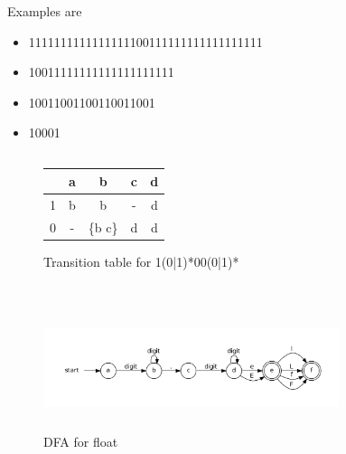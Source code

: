 \documentclass{article}
\begin{document}
Examples are 
\begin{itemize}
  \item 1111111111111111100111111111111111111
  \item 10011111111111111111111
  \item 10011001100110011001
  \item 10001
\end{itemize}



\subsection{}
\begin{figure}[h]
\begin{tabular}{|l||c|c|c|c|}
\hline
 & a & b & c & d\\
\hline
\hline
1 & b & b & - & d\\
0 & - & \{b c\} & d & d \\
\hline
\end{tabular}
\caption{Transition table for 1(0|1)*00(0|1)*}
\end{figure}
\section{}
\begin{figure}[h]
\includegraphics[width=327px, height=136px]{NDFA4.pdf}
\caption{DFA for float}
\end{figure}
\end{document}
